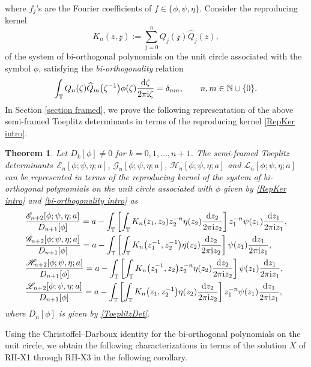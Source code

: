 \documentclass[pdftex]{sigma}
\numberwithin{equation}{section}
\newtheorem{Theorem}{Theorem}[section]
\newcommand{\N}{{\mathbb N}}
\newcommand{\T}{{\mathbb T}}
\newcommand{\de}{\delta}
\newcommand{\ze}{\zeta}
\newcommand{\ii}{{\rm i}}
\newcommand{\dd}{{\rm d}}
\begin{document}
	where $f_j$'s are the Fourier coefficients of $f \in \{ \phi, \psi, \eta \}$. Consider the reproducing kernel
	\begin{equation}\label{RepKer intro}
		K_{n}(z,\mathcal{z}) := \sum_{j=0}^{n} Q_{j}(\mathcal{z})\widehat{Q}_{j}(z),
	\end{equation} of the system of bi-orthogonal polynomials on the unit circle associated with the symbol $\phi$, satisfying the \textit{bi-orthogonality} relation
	\begin{equation}\label{bi-orthogonality intro}
		\int_{\T} Q_n(\ze)\widehat{Q}_m\big(\ze^{-1}\big)\phi(\ze)\frac{\dd \ze}{2\pi \ii \ze}= \de_{nm}, \qquad n,m \in \N \cup \{0\}.
	\end{equation}
	In Section \ref{section framed}, we prove the following representation of the above semi-framed Toeplitz determinants in terms of the reproducing kernel \eqref{RepKer intro}.
	
	\begin{Theorem}\label{semis in terms of RepKer intro}
		Let $D_k[\phi] \neq 0$ for $k=0,1,\dots, n+1$.	The semi-framed Toeplitz determinants~${\mathscr{E}_n[\phi;\psi,\eta;a]}$, $\mathscr{G}_n[\phi;\psi,\eta;a]$, $\mathscr{H}_n[\phi;\psi,\eta;a]$ and $\mathscr{L}_n[\phi;\psi,\eta;a]$ can be represented in terms of the reproducing kernel of the system of bi-orthogonal polynomials on the unit circle associated with $\phi$ given by \eqref{RepKer intro} and \eqref{bi-orthogonality intro} as
		\begin{align}
			&\frac{\mathscr{E}_{n+2}[\phi; \psi, \eta ;a]}{D_{n+1}[\phi]} = a - \int_{\T} \left[ \int_{\T} K_n(z_1,z_2) z_2^{-n} \eta(z_2) \frac{\dd z_2}{2 \pi \ii z_2} \right] z_1^{-n} \psi(z_1) \frac{\dd z_1}{2 \pi \ii z_1}, \nonumber \\
& \frac{\mathscr{G}_{n+2}[\phi; \psi, \eta ;a]}{D_{n+1}[\phi]} = a - \int_{\T} \left[ \int_{\T} K_n\big(z^{-1}_1,z^{-1}_2\big) \eta(z_2) \frac{\dd z_2}{2 \pi \ii z_2} \right] \psi(z_1) \frac{\dd z_1}{2 \pi \ii z_1}, \nonumber \\
& \frac{\mathscr{H}_{n+2}[\phi; \psi, \eta ;a]}{D_{n+1}[\phi]} = a - \int_{\T} \left[ \int_{\T} K_n\big(z^{-1}_1,z_2\big) z_2^{-n} \eta(z_2) \frac{\dd z_2}{2 \pi \ii z_2} \right] \psi(z_1) \frac{\dd z_1}{2 \pi \ii z_1}, \label{H} \\
& \frac{\mathscr{L}_{n+2}[\phi; \psi, \eta ;a]}{D_{n+1}[\phi]} = a - \int_{\T} \left[ \int_{\T} K_n\big(z_1,z^{-1}_2\big) \eta(z_2) \frac{\dd z_2}{2 \pi \ii z_2} \right] z^{-n}_1 \psi(z_1) \frac{\dd z_1}{2 \pi \ii z_1}, \nonumber
		\end{align}
		where $D_{n}[\phi]$ is given by \eqref{ToeplitzDet}.
	\end{Theorem}
	Using the Christoffel--Darboux identity for the bi-orthogonal polynomials on the unit circle, we obtain the following characterizations in terms of the solution $X$ of {\rm RH-X1} through {\rm RH-X3} in the following corollary.
	
\end{document}
